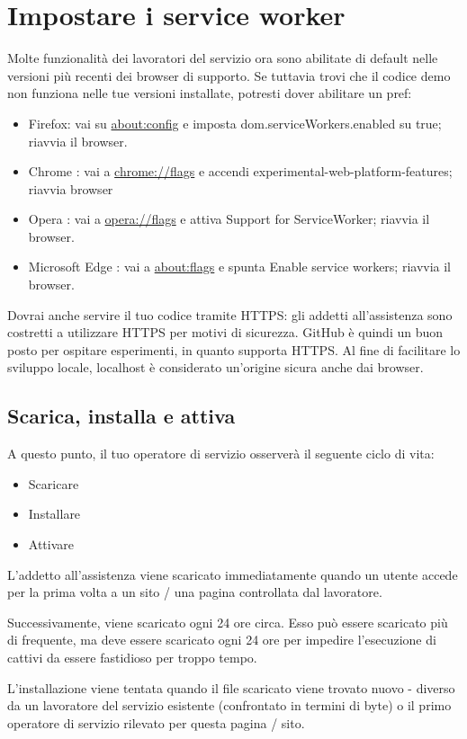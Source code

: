 \documentclass[italian]{article}
\begin{document}
\section{Impostare i service worker}
Molte funzionalità dei lavoratori del servizio ora sono abilitate di default nelle versioni più recenti dei browser di supporto. Se tuttavia trovi che il codice demo non funziona nelle tue versioni installate, potresti dover abilitare un pref:
\begin{itemize}
\item Firefox: vai su \url{about:config} e imposta  dom.serviceWorkers.enabled su true; riavvia il browser.
\item Chrome : vai a  \url{chrome://flags} e accendi  experimental-web-platform-features; riavvia browser
\item Opera : vai a \url{opera://flags} e attiva  Support for ServiceWorker; riavvia il browser.
\item Microsoft Edge : vai a  \url{about:flags} e spunta  Enable service workers; riavvia il browser.
\end{itemize}
Dovrai anche servire il tuo codice tramite HTTPS: gli addetti all'assistenza sono costretti a utilizzare HTTPS per motivi di sicurezza. GitHub è quindi un buon posto per ospitare esperimenti, in quanto supporta HTTPS. Al fine di facilitare lo sviluppo locale,  localhost è considerato un'origine sicura anche dai browser.


\subsection{Scarica, installa e attiva}
A questo punto, il tuo operatore di servizio osserverà il seguente ciclo di vita:
\begin{itemize}
\item Scaricare
\item Installare
\item Attivare
\end{itemize}
L'addetto all'assistenza viene scaricato immediatamente quando un utente accede per la prima volta a un sito / una pagina controllata dal lavoratore.

Successivamente, viene scaricato ogni 24 ore circa. Esso può essere scaricato più di frequente, ma deve essere scaricato ogni 24 ore per impedire l'esecuzione di cattivi da essere fastidioso per troppo tempo.

L'installazione viene tentata quando il file scaricato viene trovato nuovo - diverso da un lavoratore del servizio esistente (confrontato in termini di byte) o il primo operatore di servizio rilevato per questa pagina / sito.
\end{document}
